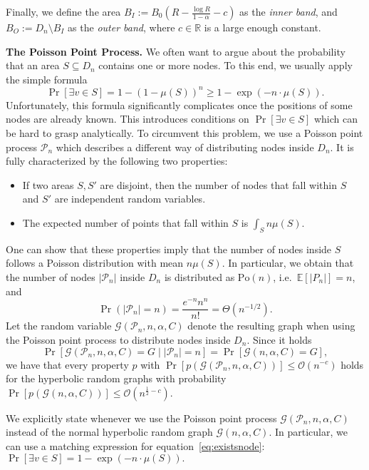 \documentclass{llncs}
\newcommand{\Oh}{\mathcal{O}}
\def\Ex{\mathbb{E}}
\def\Pr{\operatorname{Pr}}
\newcommand{\eq}[1]{equation~\eqref{eq:#1}}
\renewcommand{\leq}{\leqslant}
\renewcommand{\geq}{\geqslant}
\begin{document}
Finally, we define the area $B_I := B_0(R-\tfrac{\log R}{1-\alpha} - c)$ as the {\em inner band}, and $B_O := D_n \setminus B_I$ as the {\em outer band}, where $c \in \mathbb R$ is a large enough constant. 


\medskip \noindent \textbf{The Poisson Point Process.}
We often want to argue about the probability that an area $S \subseteq D_n$ contains one or more nodes. To this end, we usually apply the simple formula
\begin{equation} \Pr[\exists v \in S] = 1 - (1 - \mu(S))^n \geq 1 - \exp(-n \cdot \mu(S)). \label{eq:existsnode} \end{equation}
Unfortunately, this formula significantly complicates once the positions of some nodes are already known. This introduces conditions on $\Pr[\exists v \in S]$ which can be hard to grasp analytically. To circumvent this problem, we use a Poisson point process $\mathcal P_n$ \cite{penrose2003random} which describes a different way of distributing nodes inside $D_n$. It is fully characterized by the following two properties:
\begin{itemize}
\item If two areas $S,S'$ are disjoint, then the number of nodes that fall within $S$ and $S'$ are independent random variables.
\item The expected number of points that fall within $S$ is $\int_S n \mu(S)$.
\end{itemize}
One can show that these properties imply that the number of nodes inside $S$ follows a Poisson distribution with mean $n\mu(S)$. In particular, we obtain that the number of nodes $|\mathcal P_n|$ inside $D_n$ is distributed as $\mathrm{Po}(n)$, i.e.\ $\Ex[|P_n|] = n$, and 
$$\Pr(|\mathcal P_n| = n) = \frac{e^{-n} n^n}{n!} = \Theta(n^{-1/2}).$$
Let the random variable $\mathcal G(\mathcal P_n, n, \alpha, C)$ denote the resulting graph when using the Poisson point process to distribute nodes inside $D_n$. Since it holds
$$\Pr[\mathcal G(\mathcal P_n, n, \alpha, C) = G \mid |\mathcal P_n| = n] = \Pr[\mathcal G(n,\alpha,C) = G],$$
we have that every property $p$ with $\Pr[p(\mathcal G(\mathcal P_n, n, \alpha, C))] \leq \Oh(n^{-c})$ holds for the hyperbolic random graphs with probability $\Pr[p(\mathcal G(n,\alpha,C))] \leq \Oh(n^{\frac12 -c})$.

We explicitly state whenever we use the Poisson point process $\mathcal G(\mathcal P_n,n,\alpha,C)$ instead of the normal hyperbolic random graph $\mathcal G(n,\alpha,C)$. In particular, we can use a matching expression for \eq{existsnode}:
$\Pr[\exists v \in S] = 1 - \exp(-n \cdot \mu(S)).$
\end{document}
